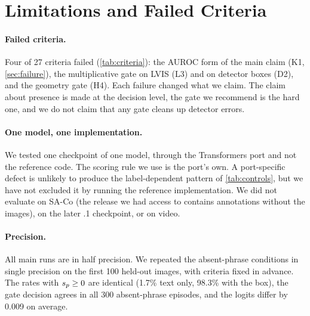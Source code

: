 \section{Limitations and Failed Criteria}
\label{sec:limits}

\begin{table}[t]
    \centering
    \footnotesize
    \setlength{\tabcolsep}{3pt}
    
    \caption{\textbf{Every preregistered criterion and its outcome.}
    \emph{Pass} counts the bootstrap resamples, out of eight, in which the criterion held; six are needed.
    Failures are in bold.
    FP: absent-phrase episodes that return a mask.
    Phases 1--2 use the COCO and selection images; phase 3 adds the held-out images, the box controls, a second detector and counting; phase 4 is the precision check.}
    \label{tab:criteria}
\end{table}

\paragraph{Failed criteria.}
Four of 27 criteria failed (\cref{tab:criteria}): the AUROC form of the main claim (K1, \cref{sec:failure}), the multiplicative gate on LVIS (L3) and on detector boxes (D2), and the geometry gate (H4).
Each failure changed what we claim.
The claim about presence is made at the decision level, the gate we recommend is the hard one, and we do not claim that any gate cleans up detector errors.

\paragraph{One model, one implementation.}
We tested one checkpoint of one model, through the Transformers port and not the reference code.
The scoring rule we use is the port's own.
A port-specific defect is unlikely to produce the label-dependent pattern of \cref{tab:controls}, but we have not excluded it by running the reference implementation.
We did not evaluate on SA-Co (the release we had access to contains annotations without the images), on the later \sam{}.1 checkpoint, or on video.

\paragraph{Precision.}
All main runs are in half precision.
We repeated the absent-phrase conditions in single precision on the first 100 held-out images, with criteria fixed in advance.
The rates with $s_p \geq 0$ are identical (1.7\% text only, 98.3\% with the box), the gate decision agrees in all 300 absent-phrase episodes, and the logits differ by 0.009 on average.

